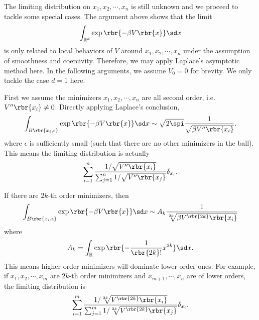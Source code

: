 \documentclass[english, nochinese]{pnote}
\begin{document}
The limiting distribution on $ x_1, x_2, \cdots, x_n $ is still unknown and we proceed to tackle some special cases. The argument above shows that the limit
\begin{equation}
\int_{\mathbb{R}^d} \exp \rbr{ -\beta V \rbr{x} } \sd x
\end{equation}
is only related to local behaviors of $V$ around $ x_1, x_2, \cdots, x_n $ under the assumption of smoothness and coercivity. Therefore, we may apply Laplace's asymptotic method here. In the following arguments, we assume $ V_0 = 0 $ for brevity. We only tackle the case $ d = 1 $ here.

First we assume the minimizers $ x_1, x_2, \cdots, x_n $ are all second order, i.e. $ V'' \rbr{x_i} \neq 0 $. Directly applying Laplace's conclusion,
\begin{equation}
\int_{ B \rbr{ x_i, \epsilon } } \exp \rbr{ -\beta V \rbr{x} } \sd x \sim \sqrt{ 2 \spi } \frac{1}{\sqrt{ \beta V'' \rbr{x_i} }}.
\end{equation}
where $\epsilon$ is sufficiently small (such that there are no other minimizers in the ball). This means the limiting distribution is actually
\begin{equation}
\sum_{ i = 1 }^n \frac{ 1 / \sqrt{ V'' \rbr{x_i} } }{ \sum_{ j = 1 }^n 1 / \sqrt{ V'' \rbr{x_j} } } \delta_{x_i}.
\end{equation}

If there are $ 2 k $-th order minimizers, then
\begin{equation}
\int_{ B \rbr{ x_i, \epsilon } } \exp \rbr{ -\beta V \rbr{x} } \sd x \sim A_k \frac{1}{ \sqrt[ 2 k ]{ \beta V^{\rbr{ 2 k }} \rbr{x_i} } }
\end{equation}
where
\begin{equation}
A_k = \int_{\mathbb{R}} \exp \rbr{ -\frac{1}{ \rbr{ 2 k } ! } x^{ 2 k } } \sd x.
\end{equation}
This means higher order minimizers will dominate lower order ones. For example, if $ x_1, x_2, \cdots, x_m $ are $ 2 k $-th order minimizers and $ x_{ m + 1 }, \cdots, x_n $ are of lower orders, the limiting distribution is
\begin{equation}
\sum_{ i = 1 }^m \frac{ 1 / \sqrt[ 2 k ]{ V^{\rbr{ 2 k }} \rbr{x_i} } }{ \sum_{ j = 1 }^m 1 / \sqrt[ 2 k ]{ V^{\rbr{ 2 k }} \rbr{x_j} } } \delta_{x_i}.
\end{equation}
\end{document}
